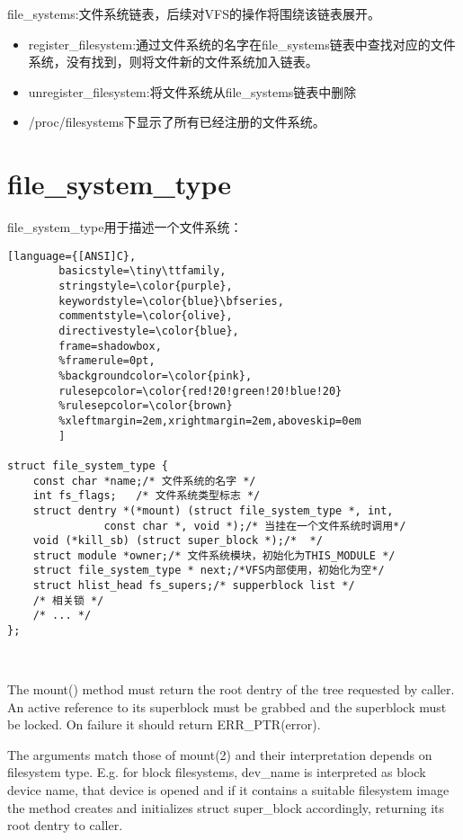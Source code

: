 file\_systems:文件系统链表，后续对VFS的操作将围绕该链表展开。

\begin{itemize}
\item register\_filesystem:通过文件系统的名字在file\_systems链表中查找对应的文件系统，没有找到，则将文件新的文件系统加入链表。
\item unregister\_filesystem:将文件系统从file\_systems链表中删除
\item /proc/filesystems下显示了所有已经注册的文件系统。
\end{itemize}





\section{file\_system\_type}
	file\_system\_type用于描述一个文件系统：

\begin{lstlisting}[language={[ANSI]C},
        basicstyle=\tiny\ttfamily,
        stringstyle=\color{purple},
        keywordstyle=\color{blue}\bfseries,
        commentstyle=\color{olive},
        directivestyle=\color{blue},
        frame=shadowbox,
        %framerule=0pt,
        %backgroundcolor=\color{pink},
        rulesepcolor=\color{red!20!green!20!blue!20}
        %rulesepcolor=\color{brown}
        %xleftmargin=2em,xrightmargin=2em,aboveskip=0em
        ]
        
struct file_system_type {
	const char *name;/* 文件系统的名字 */
	int fs_flags;	/* 文件系统类型标志 */
	struct dentry *(*mount) (struct file_system_type *, int,
		       const char *, void *);/* 当挂在一个文件系统时调用*/
	void (*kill_sb) (struct super_block *);/*  */
	struct module *owner;/* 文件系统模块，初始化为THIS_MODULE */
	struct file_system_type * next;/*VFS内部使用，初始化为空*/
	struct hlist_head fs_supers;/* supperblock list */
	/* 相关锁 */
	/* ... */
};
        
        
\end{lstlisting}


 The mount() method must return the root dentry of the tree requested by
 caller.  An active reference to its superblock must be grabbed and the
 superblock must be locked.  On failure it should return ERR\_PTR(error).
 
 The arguments match those of mount(2) and their interpretation
 depends on filesystem type.  E.g. for block filesystems, dev\_name is
 interpreted as block device name, that device is opened and if it
 contains a suitable filesystem image the method creates and initializes
 struct super\_block accordingly, returning its root dentry to caller.
 
